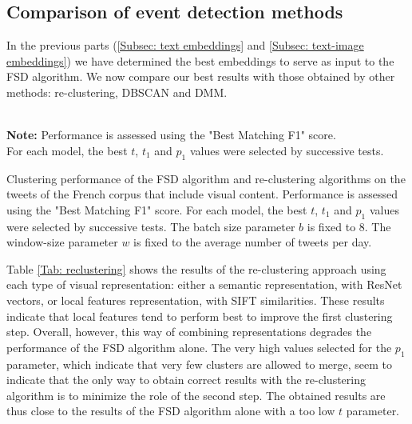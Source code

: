\subsection{Comparison of event detection methods}

In the previous parts (\ref{Subsec: text embeddings} and \ref{Subsec: text-image embeddings})  we have determined the best embeddings to serve as input to the FSD algorithm. We now compare our best results with those obtained by other methods: re-clustering, DBSCAN and DMM.

\begin{table}[ht]
\begin{center}

\\

{\scriptsize \textbf{Note:} Performance is assessed using the "Best Matching F1" score.\\ 
For each model, the best $t$, $t_1$ and $p_1$ values were selected by successive tests.}
\caption[Clustering performance of the FSD algorithm and re-clustering algorithms on the tweets of the French corpus that include visual content.]{Clustering performance of the FSD algorithm and re-clustering algorithms on the tweets of the French corpus that include visual content. Performance is assessed using the "Best Matching F1" score. For each model, the best  $t$, $t_1$ and $p_1$ values were selected by successive tests. The batch size parameter $b$ is fixed to 8. The window-size parameter $w$ is fixed to the average number of tweets per day.} \label{Tab: reclustering}
\end{center}
\end{table}
Table \ref{Tab: reclustering} shows the results of the re-clustering approach using each type of visual representation: either a semantic representation, with ResNet vectors, or local features representation, with SIFT similarities. These results indicate that local features tend to perform best to improve the first clustering step. Overall, however, this way of combining representations degrades the performance of the FSD algorithm alone. The very high values selected for the $p_1$ parameter, which indicate that very few clusters are allowed to merge, seem to indicate that the only way to obtain correct results with the re-clustering algorithm is to minimize the role of the second step. The obtained results are thus close to the results of the FSD algorithm alone with a too low $t$ parameter.

